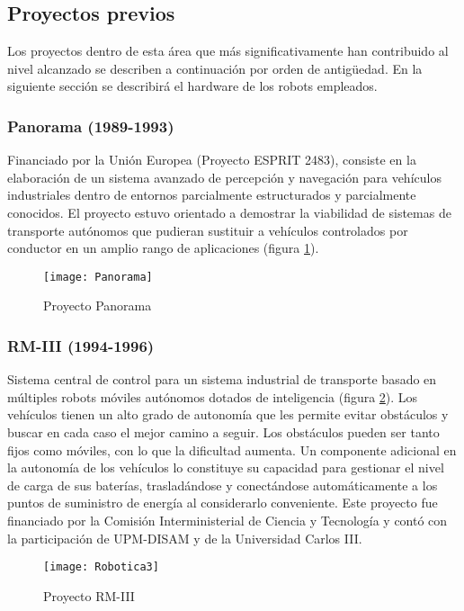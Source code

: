 \subsection{Proyectos previos}\label{sc:previos}
Los proyectos dentro de esta área que más significativamente han contribuido al nivel alcanzado se describen a continuación por orden de antigüedad. En la siguiente sección se describirá el hardware de los robots empleados.

\subsubsection{Panorama (1989-1993)}
Financiado por la Unión Europea (Proyecto ESPRIT 2483), consiste en la elaboración de un sistema avanzado de percepción y navegación para vehículos industriales dentro de entornos parcialmente estructurados y parcialmente conocidos. El proyecto estuvo orientado a demostrar la viabilidad de sistemas de transporte autónomos que pudieran sustituir a vehículos controlados por conductor en un amplio rango de aplicaciones (figura \ref{fg:panorama}).

\begin{figure}[hbt]
  \centering\texttt{[image: Panorama]}\\
  \caption{Proyecto Panorama}\label{fg:panorama}
\end{figure}


\subsubsection{RM-III (1994-1996)}
Sistema central de control para un sistema industrial de transporte basado en múltiples robots móviles autónomos dotados de inteligencia (figura \ref{fg:RM-III}). Los vehículos tienen un alto grado de autonomía que les permite evitar obstáculos y buscar en cada caso el mejor camino a seguir. Los obstáculos pueden ser tanto fijos como móviles, con lo que la dificultad aumenta. Un componente adicional en la autonomía de los vehículos lo constituye su capacidad para gestionar el nivel de carga de sus baterías, trasladándose y conectándose automáticamente a los puntos de suministro de energía al considerarlo conveniente. Este proyecto fue financiado por la Comisión Interministerial de Ciencia y Tecnología y contó con la participación de UPM-DISAM y de la Universidad Carlos III.

\begin{figure}[hbt]
  \centering\texttt{[image: Robotica3]}\\
  \caption{Proyecto RM-III}\label{fg:RM-III}
\end{figure}


